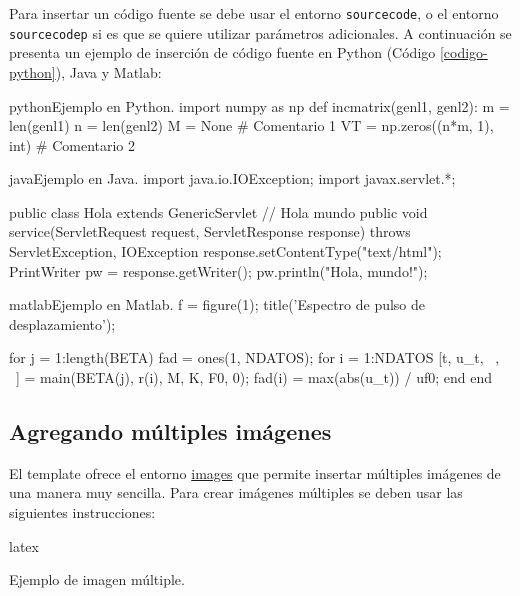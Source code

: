	Para insertar un código fuente se debe usar el entorno \texttt{sourcecode}, o el entorno \texttt{sourcecodep} si es que se quiere utilizar parámetros adicionales. A continuación se presenta un ejemplo de inserción de código fuente en Python (Código \ref{codigo-python}), Java y Matlab:

\begin{sourcecode}[\label{codigo-python}]{python}{Ejemplo en Python.}
import numpy as np
def incmatrix(genl1, genl2):
	m = len(genl1)
	n = len(genl2)
	M = None # Comentario 1
	VT = np.zeros((n*m, 1), int) # Comentario 2
\end{sourcecode}

\begin{sourcecode}[]{java}{Ejemplo en Java.}
import java.io.IOException;
import javax.servlet.*;

public class Hola extends GenericServlet { // Hola mundo
	public void service(ServletRequest request, ServletResponse response)
	throws ServletException, IOException{
		response.setContentType("text/html");
		PrintWriter pw = response.getWriter();
		pw.println("Hola, mundo!");
	}
}
\end{sourcecode}

\begin{sourcecode}{matlab}{Ejemplo en Matlab.}
f = figure(1);
title('Espectro de pulso de desplazamiento');

for j = 1:length(BETA)
	fad = ones(1, NDATOS); %
	for i = 1:NDATOS
		[t, u_t, ~, ~] = main(BETA(j), r(i), M, K, F0, 0);
		fad(i) = max(abs(u_t)) / uf0;
	end
end
\end{sourcecode}

\subsection{Agregando múltiples imágenes}

	El template ofrece el entorno \href{https://latex.ppizarror.com/informe.html#hlp-images}{images} que permite insertar múltiples imágenes de una manera muy sencilla. Para crear imágenes múltiples se deben usar las siguientes instrucciones:

\begin{sourcecode}{latex}{}
\begin{images}[\label{imagenmultiple}]{Ejemplo de imagen múltiple.}
	\imagesnewline
\end{images}
\end{sourcecode}

